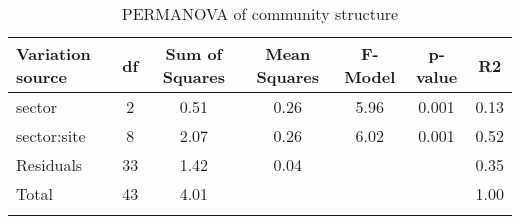 \captionsetup[table]{labelformat=empty,skip=1pt}
\begin{longtable}{lcccccc}
\toprule
\textbf{Variation source} & \textbf{df} & \textbf{Sum of Squares} & \textbf{Mean Squares} & \textbf{F-Model} & \textbf{p-value} & \textbf{R2} \\ 
\midrule
sector & 2 & 0.51 & 0.26 & 5.96 & 0.001 & 0.13 \\ 
sector:site & 8 & 2.07 & 0.26 & 6.02 & 0.001 & 0.52 \\ 
Residuals & 33 & 1.42 & 0.04 &  &  & 0.35 \\ 
Total & 43 & 4.01 &  &  &  & 1.00 \\ 
\bottomrule
\caption{\label{tab:somelabel} PERMANOVA of community structure}
\end{longtable}

